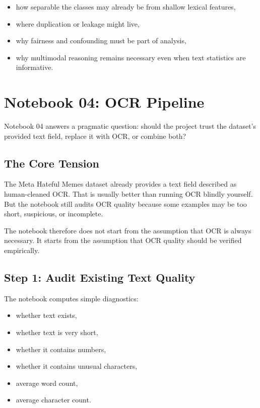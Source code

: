 \documentclass[11pt,a4paper]{report}
\begin{document}
\begin{itemize}
\item how separable the classes may already be from shallow lexical features,
\item where duplication or leakage might live,
\item why fairness and confounding must be part of analysis,
\item why multimodal reasoning remains necessary even when text statistics are informative.
\end{itemize}

\chapter{Notebook 04: OCR Pipeline}

Notebook 04 answers a pragmatic question: should the project trust the dataset's provided text field, replace it with OCR, or combine both?

\section{The Core Tension}

The Meta Hateful Memes dataset already provides a text field described as human-cleaned OCR. That is usually better than running OCR blindly yourself. But the notebook still audits OCR quality because some examples may be too short, suspicious, or incomplete.

The notebook therefore does not start from the assumption that OCR is always necessary. It starts from the assumption that OCR quality should be verified empirically.

\section{Step 1: Audit Existing Text Quality}

The notebook computes simple diagnostics:

\begin{itemize}
\item whether text exists,
\item whether text is very short,
\item whether it contains numbers,
\item whether it contains unusual characters,
\item average word count,
\item average character count.
\end{itemize}
\end{document}
